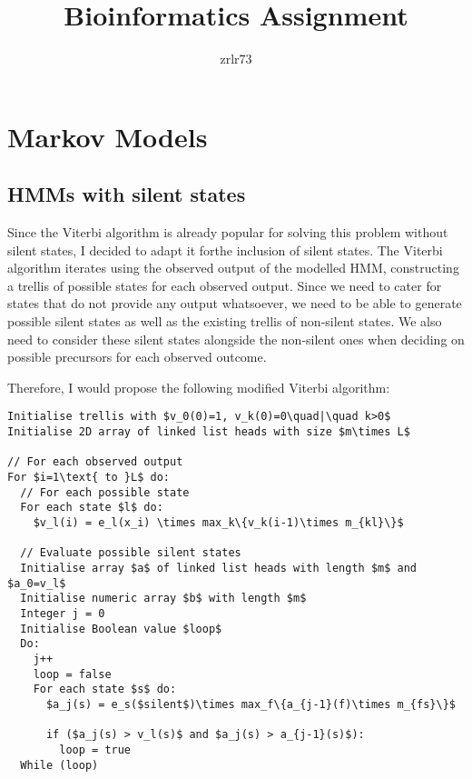 \documentclass[11pt]{article} %
\title{\vspace{-1.6cm}Bioinformatics Assignment}
\author{zrlr73}
\date{} %
\begin{document}
\maketitle

\section{Markov Models}
\subsection{HMMs with silent states}
Since the Viterbi algorithm is already popular for solving this problem without silent states, I decided to adapt it forthe inclusion of silent states. The Viterbi algorithm iterates using the observed output of the modelled HMM, constructing a trellis of possible states for each observed output. Since we need to cater for states that do not provide any output whatsoever, we need to be able to generate possible silent states as well as the existing trellis of non-silent states. We also need to consider these silent states alongside the non-silent ones when deciding on possible precursors for each observed outcome.

Therefore, I would propose the following modified Viterbi algorithm:
\begin{lstlisting}
Initialise trellis with $v_0(0)=1, v_k(0)=0\quad|\quad k>0$
Initialise 2D array of linked list heads with size $m\times L$

// For each observed output
For $i=1\text{ to }L$ do:
  // For each possible state
  For each state $l$ do:
    $v_l(i) = e_l(x_i) \times max_k\{v_k(i-1)\times m_{kl}\}$

  // Evaluate possible silent states
  Initialise array $a$ of linked list heads with length $m$ and $a_0=v_l$
  Initialise numeric array $b$ with length $m$
  Integer j = 0
  Initialise Boolean value $loop$
  Do:
    j++
    loop = false
    For each state $s$ do:
      $a_j(s) = e_s($silent$)\times max_f\{a_{j-1}(f)\times m_{fs}\}$

      if ($a_j(s) > v_l(s)$ and $a_j(s) > a_{j-1}(s)$):
        loop = true
  While (loop)

\end{lstlisting}
\end{document}
